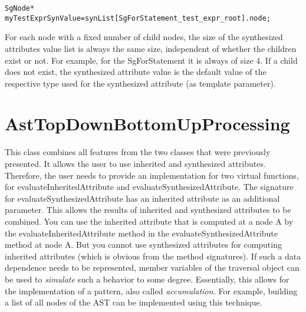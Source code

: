 {\indent
{\mySmallFontSize
\begin{verbatim}
SgNode* myTestExprSynValue=synList[SgForStatement_test_expr_root].node;
\end{verbatim}
}}
For each node with a fixed number of child nodes, the size of the synthesized
attributes value list is always the same size, independent of whether the children
exist or not. For example, for the SgForStatement it is always of size 4. If a child
does not exist, the synthesized attribute value is the default value of the respective
type used for the synthesized attribute (as template parameter).

\section{AstTopDownBottomUpProcessing}
\label{AstProcessing:AstTopDownBottomUpProcessing}

This class combines all features from the two classes that were previously presented.  It
allows the user to use inherited and synthesized attributes. Therefore, the user needs
to provide an implementation for two virtual functions, for
evaluateInheritedAttribute and evaluateSynthesizedAttribute. The
signature for evaluateSynthesizedAttribute has an inherited attribute
as an additional parameter. This allows the results of
inherited and synthesized attributes to be combined. You can use the
inherited attribute that is computed at a
node A by the evaluateInheritedAttribute method in the evaluateSynthesizedAttribute method at node A. But you cannot
use synthesized attributes for computing inherited attributes (which is obvious from the method signatures). If such a data
dependence needs to be represented, member variables of the traversal
object can be used to {\em simulate} such a behavior to some
degree. Essentially, this allows for the implementation of a pattern, also called
{\em accumulation.} For example, building a list of all nodes of the AST
can be implemented using this technique.

